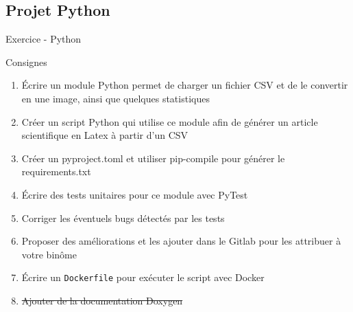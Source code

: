 \documentclass{beamer}
\begin{document}
\subsection{Projet Python}

\begin{frame}[fragile]{Exercice - Python}
\begin{exampleblock}{Consignes}
  \begin{enumerate}
    \item Écrire un module Python permet de charger un fichier CSV et de le convertir en une image, ainsi que quelques statistiques
    \item Créer un script Python qui utilise ce module afin de générer un article scientifique en Latex à partir d'un CSV
    \item Créer un pyproject.toml et utiliser pip-compile pour générer le requirements.txt
    \item Écrire des tests unitaires pour ce module avec PyTest
    \item Corriger les éventuels bugs détectés par les tests
    \item Proposer des améliorations et les ajouter dans le Gitlab pour les attribuer à votre binôme
    \item Écrire un \texttt{Dockerfile} pour exécuter le script avec Docker
    \item \sout{Ajouter de la documentation Doxygen}
  \end{enumerate}
\end{exampleblock}
\end{frame}  
    


\end{document}
